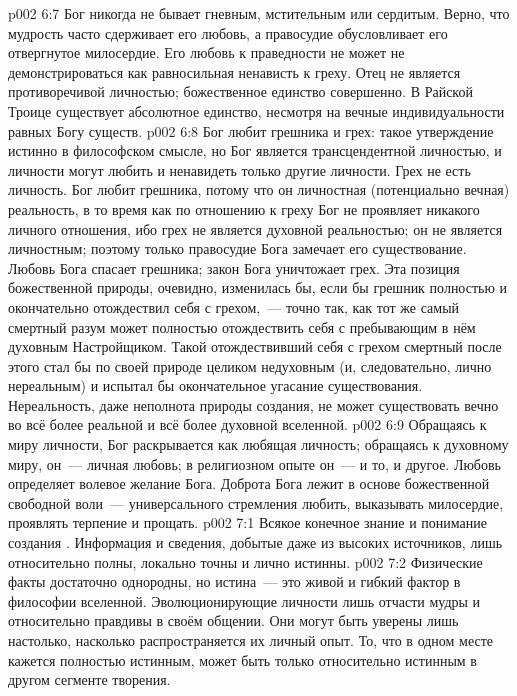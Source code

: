 \vs p002 6:7 \pc Бог никогда не бывает гневным, мстительным или сердитым. Верно, что мудрость часто сдерживает его любовь, а правосудие обусловливает его отвергнутое милосердие. Его любовь к праведности не может не демонстрироваться как равносильная ненависть к греху. Отец не является противоречивой личностью; божественное единство совершенно. В Райской Троице существует абсолютное единство, несмотря на вечные индивидуальности равных Богу существ.
\vs p002 6:8 \pc Бог любит грешника и  грех: такое утверждение истинно в философском смысле, но Бог является трансцендентной личностью, и личности могут любить и ненавидеть только другие личности. Грех не есть личность. Бог любит грешника, потому что он личностная (потенциально вечная) реальность, в то время как по отношению к греху Бог не проявляет никакого личного отношения, ибо грех не является духовной реальностью; он не является личностным; поэтому только правосудие Бога замечает его существование. Любовь Бога спасает грешника; закон Бога уничтожает грех. Эта позиция божественной природы, очевидно, изменилась бы, если бы грешник полностью и окончательно отождествил себя с грехом,~--- точно так, как тот же самый смертный разум может полностью отождествить себя с пребывающим в нём духовным Настройщиком. Такой отождествивший себя с грехом смертный после этого стал бы по своей природе целиком недуховным (и, следовательно, лично нереальным) и испытал бы окончательное угасание существования. Нереальность, даже неполнота природы создания, не может существовать вечно во всё более реальной и всё более духовной вселенной.
\vs p002 6:9 \pc Обращаясь к миру личности, Бог раскрывается как любящая личность; обращаясь к духовному миру, он~--- личная любовь; в религиозном опыте он~--- и то, и другое. Любовь определяет волевое желание Бога. Доброта Бога лежит в основе божественной свободной воли~--- универсального стремления любить, выказывать милосердие, проявлять терпение и прощать.
\vs p002 7:1 Всякое конечное знание и понимание создания . Информация и сведения, добытые даже из высоких источников, лишь относительно полны, локально точны и лично истинны.
\vs p002 7:2 Физические факты достаточно однородны, но истина~--- это живой и гибкий фактор в философии вселенной. Эволюционирующие личности лишь отчасти мудры и относительно правдивы в своём общении. Они могут быть уверены лишь настолько, насколько распространяется их личный опыт. То, что в одном месте кажется полностью истинным, может быть только относительно истинным в другом сегменте творения.
